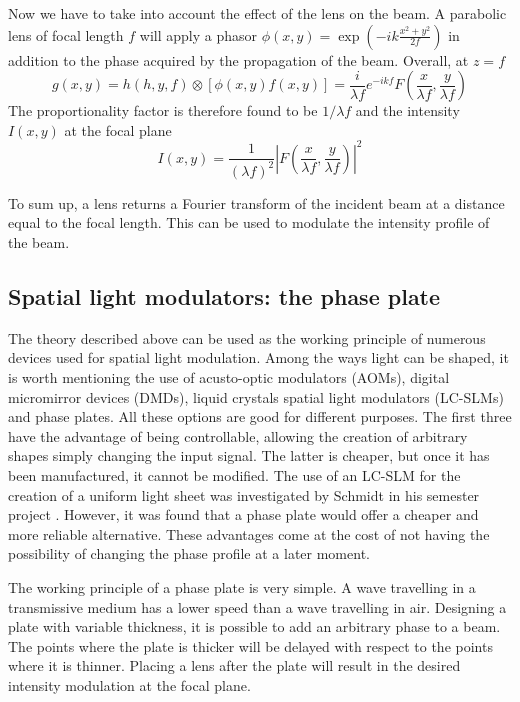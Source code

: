 Now we have to take into account the effect of the lens on the beam. A parabolic lens of focal length $f$ will apply a phasor $\phi(x,y) = \exp(-ik\frac{x^2+y^2}{2f})$ in addition to the phase acquired by the propagation of the beam. Overall, at $z=f$
\begin{equation}
    g(x,y) = h(h,y,f) \otimes \left[ \phi(x,y) f(x,y) \right]
    = \frac{i}{\lambda f} e^{-ikf} F\left(\frac{x}{\lambda f}, \frac{y}{\lambda f}\right)
\end{equation}
The proportionality factor is therefore found to be $1/\lambda f$
and the intensity $I(x,y)$ at the focal plane
\begin{equation}
    I(x,y) = \frac{1}{(\lambda f)^2} \left| F\left(\frac{x}{\lambda f}, \frac{y}{\lambda f}\right) \right|^2
\end{equation}

To sum up, a lens returns a Fourier transform of the incident beam at a distance equal to the focal length. This can be used to modulate the intensity profile of the beam.

\subsection{Spatial light modulators: the phase plate}
The theory described above can be used as the working principle of numerous devices used for spatial light modulation. Among the ways light can be shaped, it is worth mentioning the use of acusto-optic modulators (AOMs), digital micromirror devices (DMDs), liquid crystals spatial light modulators (LC-SLMs) and phase plates. All these options are good for different purposes. The first three have the advantage of being controllable, allowing the creation of arbitrary shapes simply changing the input signal. The latter is cheaper, but once it has been manufactured, it cannot be modified.
The use of an LC-SLM for the creation of a uniform light sheet was investigated by Schmidt in his semester project \cite{schmidt2021}. However, it was found that a phase plate would offer a cheaper and more reliable alternative. These advantages come at the cost of not having the possibility of changing the phase profile at a later moment.

The working principle of a phase plate is very simple. A wave travelling in a transmissive medium has a lower speed than a wave travelling in air. Designing a plate with variable thickness, it is possible to add an arbitrary phase to a beam. The points where the plate is thicker will be delayed with respect to the points where it is thinner. Placing a lens after the plate will result in the desired intensity modulation at the focal plane.

